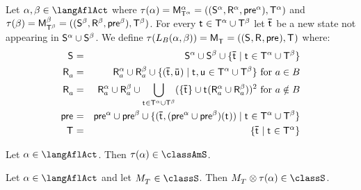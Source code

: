 \begin{definition}[Learning]\label{afl-s-learning}
    Let $\alpha, \beta \in \langAflAct$ where $\tau(\alpha) = \aPModel[\alpha]{\aStatesT[\alpha]} = \aPModelTuple[\alpha]{\aStatesT[\alpha]}$ and $\tau(\beta) = \aPModel[\beta]{\aStatesT[\beta]} = \aPModelTuple[\beta]{\aStatesT[\beta]}$.
    For every $\aStateT \in \aStatesT[\alpha] \cup \aStatesT[\beta]$ let $\aPStateT$ be a new state not appearing in $\aStates[\alpha] \cup \aStates[\beta]$.
    We define $\tau(\learns_\agentsB (\alpha, \beta)) = \aPModel{\aStatesT} = \aPModelTuple{\aStatesT}$ where:
    \begin{eqnarray*}
        \aStates &=& \aStates[\alpha] \cup \aStates[\beta] \cup \{\aPStateT \mid \aStateT \in \aStatesT[\alpha] \cup \aStatesT[\beta]\}\\
        \aAccessibility{\agentA} &=& \aAccessibility[\alpha]{\agentA} \cup \aAccessibility[\beta]{\agentA} \cup \{(\aPStateT, \aPStateU) \mid \aStateT, \aStateU \in \aStatesT[\alpha] \cup \aStatesT[\beta]\} \text{ for } \agentA \in \agentsB\\
        \aAccessibility{\agentA} &=& \aAccessibility[\alpha]{\agentA} \cup \aAccessibility[\beta]{\agentA} \cup \bigcup_{\aStateT \in \aStatesT[\alpha] \cup \aStatesT[\beta]} (\{\aPStateT\} \cup \aStateT (\aAccessibility[\alpha]{\agentA} \cup \aAccessibility[\beta]{\agentA}))^2 \text{ for } \agentA \notin \agentsB\\
        \aPrecondition &=& \aPrecondition[\alpha] \cup \aPrecondition[\beta] \cup \{(\aPStateT, (\aPrecondition[\alpha] \cup \aPrecondition[\beta])(\aStateT)) \mid \aStateT \in \aStatesT[\alpha] \cup \aStatesT[\beta]\}\\
        \aStatesT &=& \{\aPStateT \mid \aStateT \in \aStatesT[\alpha]\}
    \end{eqnarray*}
\end{definition}

\begin{lemma}\label{afl-s-structure}
    Let $\alpha \in \langAflAct$. Then $\tau(\alpha) \in \classAmS$.
\end{lemma}

\begin{lemma}\label{afl-s-exec}
    Let $\alpha \in \langAflAct$ and 
    let $\kPModel{\kStatesT} \in \classS$.
    Then $\kPModel{\kStatesT} \exec \tau(\alpha) \in \classS$.
\end{lemma}

